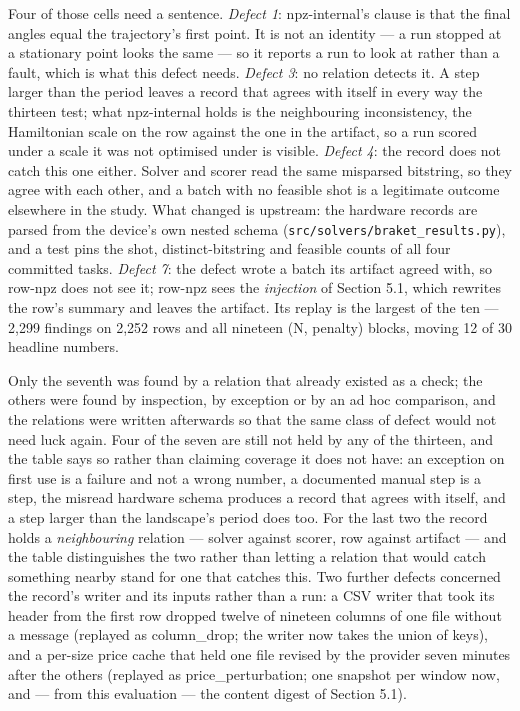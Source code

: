 \documentclass[acmsmall,screen,review]{acmart}
\begin{document}
Four of those cells need a sentence. \textit{Defect 1}: npz-internal's clause is that the final angles equal the trajectory's first point. It is not an identity --- a run stopped at a stationary point looks the same --- so it reports a run to look at rather than a fault, which is what this defect needs. \textit{Defect 3}: no relation detects it. A step larger than the period leaves a record that agrees with itself in every way the thirteen test; what npz-internal holds is the neighbouring inconsistency, the Hamiltonian scale on the row against the one in the artifact, so a run scored under a scale it was not optimised under is visible. \textit{Defect 4}: the record does not catch this one either. Solver and scorer read the same misparsed bitstring, so they agree with each other, and a batch with no feasible shot is a legitimate outcome elsewhere in the study. What changed is upstream: the hardware records are parsed from the device's own nested schema (\texttt{src/\allowbreak{}solvers/\allowbreak{}braket\_\allowbreak{}results.\allowbreak{}py}), and a test pins the shot, distinct-bitstring and feasible counts of all four committed tasks. \textit{Defect 7}: the defect wrote a batch its artifact agreed with, so row-npz does not see it; row-npz sees the \textit{injection} of Section 5.1, which rewrites the row's summary and leaves the artifact. Its replay is the largest of the ten --- 2,299 findings on 2,252 rows and all nineteen (N, penalty) blocks, moving 12 of 30 headline numbers.


Only the seventh was found by a relation that already existed as a check; the others were found by inspection, by exception or by an ad hoc comparison, and the relations were written afterwards so that the same class of defect would not need luck again. Four of the seven are still not held by any of the thirteen, and the table says so rather than claiming coverage it does not have: an exception on first use is a failure and not a wrong number, a documented manual step is a step, the misread hardware schema produces a record that agrees with itself, and a step larger than the landscape's period does too. For the last two the record holds a \textit{neighbouring} relation --- solver against scorer, row against artifact --- and the table distinguishes the two rather than letting a relation that would catch something nearby stand for one that catches this. Two further defects concerned the record's writer and its inputs rather than a run: a CSV writer that took its header from the first row dropped twelve of nineteen columns of one file without a message (replayed as column\_drop; the writer now takes the union of keys), and a per-size price cache that held one file revised by the provider seven minutes after the others (replayed as price\_perturbation; one snapshot per window now, and --- from this evaluation --- the content digest of Section 5.1).
\end{document}
